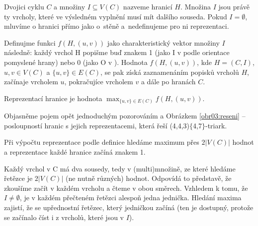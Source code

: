\begin{definice}\label{def01:1}
Dvojici cyklu $C$ a množiny $I \subseteq V(C)$ nazveme hranicí $H$. Množina $I$ jsou právě ty vrcholy, které ve výsledném vyplnění musí mít dalšího souseda. Pokud  $I = \emptyset$, mluvíme o hranici přímo jako o~stěně a~nedefinujeme pro ni reprezentaci.

Definujme funkci $f(H,(u,v))$ jako charakteristický vektor množiny $I$ následně: každý vrchol H popišme buď znakem 1 (jako I v  podle orientace pomyslené hrany) nebo 0 (jako O v ). Hodnota $f(H, (u, v))$, kde $H=(C, I)$, $u, v \in V(C)$ a $ \lbrace u, v \rbrace \in E(C)$, se pak získá zaznamenáním popisků vrcholů $H$, začínaje vrcholem $u$, pokračujíce vrcholem $v$ a dále po hranách $C$. 

Reprezentací hranice je hodnota $\max_{\lbrace u, v \rbrace \in E(C)} {f(H,(u,v))}$.
\end{definice}

Objasněme pojem opět jednoduchým pozorováním a Obrázkem \ref{obr03:reseni} -- posloupností hranic s jejich reprezentacemi, která řeší (4,4,3)$\lbrace$4,7$\rbrace$-triark. 


\begin{tvrz}
Při výpočtu reprezentace podle definice hledáme maximum přes $2 |V(C)|$ hodnot a reprezentace každé hranice začíná znakem 1.
\end{tvrz}

\begin{dukaz}
Každý vrchol v C má dva sousedy, tedy v (multi)množině, ze které hledáme řetězce je $2 |V(C)|$ (ne nutně různých) hodnot. Odpovídá to představě, že zkoušíme začít v každém vrcholu a čteme v obou směrech. Vzhledem k tomu, že $I\neq \emptyset$, je v každém přečteném řetězci alespoň jedna jednička. Hledání maxima zajistí, že se upřednostní řetězec, který jedničkou začíná (ten je dostupný, protože se začínalo číst i z vrcholů, které jsou v $I$).  
\end{dukaz}

\makeatletter
\algrenewcommand\ALG@beginalgorithmic{\footnotesize}
\makeatother


